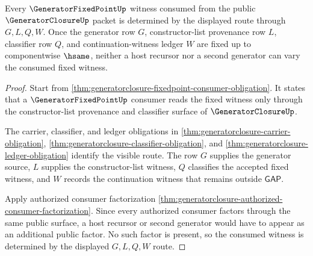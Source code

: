 \begin{theorem}
\label{thm:generatorclosure-fixedpoint-consumer-route-determinacy}
Every $\GeneratorFixedPointUp$ witness consumed from the public $\GeneratorClosureUp$ packet is determined by the displayed route through $G,L,Q,W$. Once the generator row $G$, constructor-list provenance row $L$, classifier row $Q$, and continuation-witness ledger $W$ are fixed up to componentwise $\hsame$, neither a host recursor nor a second generator can vary the consumed fixed witness.
\end{theorem}
\begin{proof}
Start from \autoref{thm:generatorclosure-fixedpoint-consumer-obligation}. It states that a $\GeneratorFixedPointUp$ consumer reads the fixed witness only through the constructor-list provenance and classifier surface of $\GeneratorClosureUp$.

The carrier, classifier, and ledger obligations in \autoref{thm:generatorclosure-carrier-obligation}, \autoref{thm:generatorclosure-classifier-obligation}, and \autoref{thm:generatorclosure-ledger-obligation} identify the visible route. The row $G$ supplies the generator source, $L$ supplies the constructor-list witness, $Q$ classifies the accepted fixed witness, and $W$ records the continuation witness that remains outside $\mathsf{GAP}$.

Apply authorized consumer factorization \autoref{thm:generatorclosure-authorized-consumer-factorization}. Since every authorized consumer factors through the same public surface, a host recursor or second generator would have to appear as an additional public factor. No such factor is present, so the consumed witness is determined by the displayed $G,L,Q,W$ route.
\end{proof}

